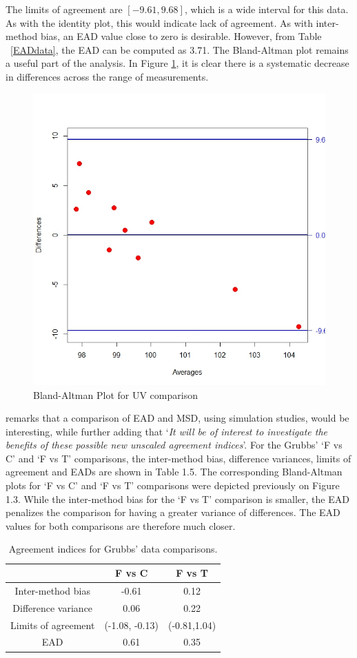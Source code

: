 \documentclass[12pt, a4paper]{report}
\theoremstyle{plain}
\theoremstyle{definition}
\theoremstyle{remark}
\begin{document}
The limits of agreement are $[-9.61, 9.68]$, which is a wide interval for this data. As with the identity plot, this would indicate lack of agreement. As with inter-method bias, an EAD value close to zero is desirable. However, from Table ~\ref{EADdata}, the EAD can be computed as 3.71. The Bland-Altman plot remains a useful part of the analysis. In Figure \ref{fig:EAD1}, it is clear there is a systematic decrease in differences across the range of measurements.
\begin{figure}[h!]
	\centering
	\includegraphics[width=0.55\linewidth]{images/EAD1}
	\caption{Bland-Altman Plot for UV comparison}
	\label{fig:EAD1}
\end{figure}

\citet{Barnhart} remarks that a comparison of EAD and MSD, using
simulation studies, would be interesting, while further adding
that `\textit{It will be of interest to investigate the benefits of these
	possible new unscaled agreement indices}'. For the Grubbs' `F vs C' and `F vs T' comparisons, the inter-method bias, difference variances, limits of agreement and EADs are shown
in Table 1.5. The corresponding Bland-Altman plots for `F vs C' and `F vs T' comparisons were depicted previously on Figure 1.3. While the inter-method bias for the `F vs T' comparison is smaller, the EAD penalizes the comparison for having a greater variance of differences. The EAD values for both comparisons are therefore much closer.
\begin{table}[ht]
	\begin{center}
		\begin{tabular}{|c||c|c|}
			\hline
			& F vs C & F vs T  \\\hline
			\hline
			Inter-method bias & -0.61 & 0.12 \\ \hline
			Difference variance & 0.06 & 0.22  \\ \hline 
			Limits of agreement & (-1.08,	-0.13) & (-0.81,1.04) \\ \hline
			EAD & 0.61 & 0.35  \\ \hline 
		\end{tabular}
		\caption{Agreement indices for Grubbs' data comparisons.}
	\end{center}
\end{table}
\end{document}
